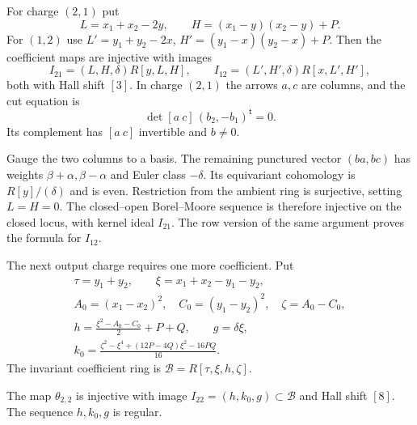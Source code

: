 For charge $(2,1)$ put
\[
 L=x_1+x_2-2y,\qquad H=(x_1-y)(x_2-y)+P.
\]
For $(1,2)$ use
$L'=y_1+y_2-2x$, $H'=(y_1-x)(y_2-x)+P$.
Then the coefficient maps are injective with images
\begin{equation}\label{cyrec:eq:next-ideals}
 I_{21}=(L,H,\delta)R[y,L,H],\qquad
 I_{12}=(L',H',\delta)R[x,L',H'],
\end{equation}
both with Hall shift $[3]$.
In charge $(2,1)$ the arrows $a,c$ are columns, and the cut equation is
\[
 \det[a\ c]\,(b_2,-b_1)^{\mathsf t}=0.
\]
Its complement has $[a\ c]$ invertible and $b\ne0$.

Gauge the two columns to a basis. The remaining punctured vector
$(ba,bc)$ has weights $\beta+\alpha,\beta-\alpha$ and Euler
class $-\delta$. Its equivariant cohomology is $R[y]/(\delta)$
and is even. Restriction from the ambient ring is surjective,
setting $L=H=0$. The closed--open Borel--Moore sequence is
therefore injective on the closed locus, with kernel ideal
$I_{21}$. The row version of the same argument proves the
formula for $I_{12}$.

The next output charge requires one more coefficient. Put
\begin{equation}\label{cyrec:eq:two-two-coordinates}
\begin{gathered}
 \tau=y_1+y_2,\qquad \xi=x_1+x_2-y_1-y_2,\\
 A_0=(x_1-x_2)^2,\quad C_0=(y_1-y_2)^2,\quad\zeta=A_0-C_0,\\
 h=\frac{\xi^2-A_0-C_0}{2}+P+Q,\qquad g=\delta\xi,\\
 k_0=\frac{\zeta^2-\xi^4+(12P-4Q)\xi^2-16PQ}{16}.
\end{gathered}
\end{equation}
The invariant coefficient ring is
$\mathscr B=R[\tau,\xi,h,\zeta]$.

\begin{lemma}\label{cyrec:lem:two-two-ideal}
The map $\theta_{2,2}$ is injective with image
$I_{22}=(h,k_0,g)\subset\mathscr B$ and Hall shift $[8]$.
The sequence $h,k_0,g$ is regular.
\end{lemma}

